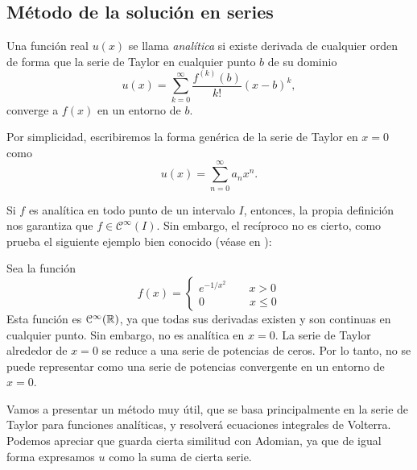 \subsection{Método de la solución en series}
\begin{definicion}
	Una función real $u(x)$ se llama \textit{analítica} si existe derivada de cualquier orden de forma que la serie de Taylor en cualquier punto $b$ de su dominio
	\begin{equation}
		u(x) = \sum_{k=0}^{\infty}\dfrac{f^{(k)}(b)}{k!}(x-b)^k,
	\end{equation}
	converge a $f(x)$ en un entorno de $b$.
\end{definicion}
Por simplicidad, escribiremos la forma genérica de la serie de Taylor en $x = 0$ como
\begin{equation}\label{eq:serie1}
	u(x) = \sum_{n=0}^{\infty}a_nx^n.
\end{equation}
\begin{observacion}
	Si $f$ es analítica en todo punto de un intervalo $I$, entonces, la propia definición nos garantiza que $f \in \mathcal{C}^\infty(I)$. Sin embargo, el recíproco no es cierto, como prueba el siguiente ejemplo bien conocido (véase en \cite{ejemploanalitica}):
	\begin{ejemplo}
		Sea la función
		\begin{equation}
			f(x) = \left\lbrace\begin{array}{c} e^{-1/x^2} \qquad x > 0 \\ 0 \qquad \qquad x \leqslant 0 \end{array}\right.
		\end{equation}
		Esta función es $\mathcal{C}^\infty(\mathbb{R})$, ya que todas sus derivadas existen y son continuas en cualquier punto. Sin embargo, no es analítica en $x = 0$. La serie de Taylor alrededor de $x=0$ se reduce a una serie de potencias de ceros. Por lo tanto, no se puede representar como una serie de potencias convergente en un entorno de $x=0$.
	\end{ejemplo}
\end{observacion}
Vamos a presentar un método muy útil, que se basa principalmente en la serie de Taylor para funciones analíticas, y resolverá ecuaciones integrales de Volterra. Podemos apreciar que guarda cierta similitud con Adomian, ya que de igual forma expresamos $u$ como la suma de cierta serie.

